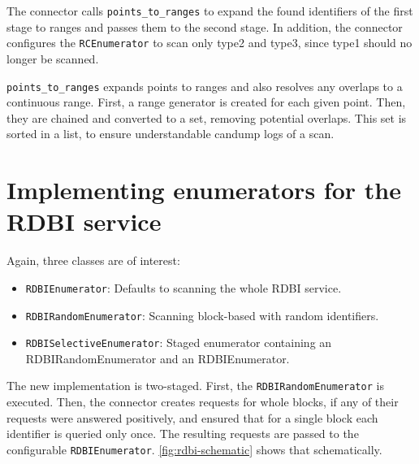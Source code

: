 The connector calls \texttt{points_to_ranges} to expand the found identifiers of the first stage to ranges and passes them to the second stage. In addition, the connector configures the \texttt{RCEnumerator} to scan only type2 and type3, since type1 should no longer be scanned.


\texttt{points_to_ranges} expands points to ranges and also resolves any overlaps to a continuous range.
First, a range generator is created for each given point. Then, they are chained and converted to a set, removing potential overlaps. This set is sorted in a list, to ensure understandable candump logs of a scan.

\section{Implementing enumerators for the RDBI service}

Again, three classes are of interest:

\begin{itemize}
    \item \texttt{RDBIEnumerator}: Defaults to scanning the whole RDBI service.
    \item \texttt{RDBIRandomEnumerator}: Scanning block-based with random identifiers.
    \item \texttt{RDBISelectiveEnumerator}: Staged enumerator containing an RDBIRandomEnumerator and an RDBIEnumerator.
\end{itemize}

The new implementation is two-staged. First, the \texttt{RDBIRandomEnumerator} is executed. Then, the connector creates requests for whole blocks, if any of their requests were answered positively, and ensured that for a single block each identifier is queried only once. The resulting requests are passed to the configurable \texttt{RDBIEnumerator}. \autoref{fig:rdbi-schematic} shows that schematically.

